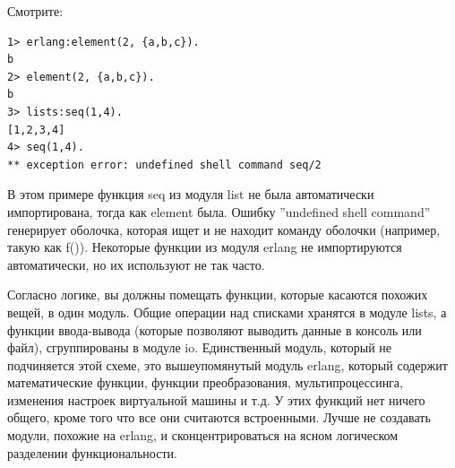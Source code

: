 \documentclass[a4paper,12pt]{report}
\newcommand{\ops}{\colorbox{lgreen}}
\begin{document}
Смотрите:
\begin{lstlisting}[style=repl]
1> erlang:element(2, {a,b,c}).
b
2> element(2, {a,b,c}).
b
3> lists:seq(1,4).
[1,2,3,4]
4> seq(1,4).
** exception error: undefined shell command seq/2
\end{lstlisting}

В этом примере функция \ops{seq} из модуля list не была автоматически импортирована, тогда как \ops{element} была. Ошибку ''undefined shell command'' генерирует оболочка, которая ищет и не находит команду оболочки (например, такую как \ops{f()}). Некоторые функции из модуля \ops{erlang} не импортируются автоматически, но их используют не так часто.

Согласно логике, вы должны помещать функции, которые касаются похожих вещей, в один модуль. Общие операции над списками хранятся в модуле \ops{lists}, а функции ввода\--вывода (которые позволяют выводить данные в консоль или файл), сгруппированы в модуле \ops{io}. Единственный модуль, который не подчиняется этой схеме, это вышеупомянутый модуль \ops{erlang}, который содержит математические функции, функции преобразования, мультипроцессинга, изменения настроек виртуальной машины и т.д. У этих функций нет ничего общего, кроме того что все они считаются встроенными. Лучше не создавать модули, похожие на \ops{erlang}, и сконцентрироваться на ясном логическом разделении функциональности.
\end{document}
